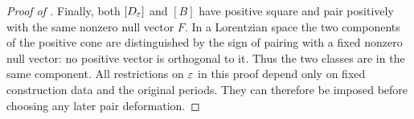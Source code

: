 \begin{proof}[Proof of ]
Finally, both $[D_\varepsilon]$ and $[B]$ have positive square and
pair positively with the same nonzero null vector $F$.  In a
Lorentzian space the two components of the positive cone are
distinguished by the sign of pairing with a fixed nonzero null
vector: no positive vector is orthogonal to it.  Thus the two
classes are in the same component.  All restrictions on $\varepsilon$
in this proof depend only on fixed construction data and the
original periods.  They can therefore be imposed before choosing
any later pair deformation.
\end{proof}
